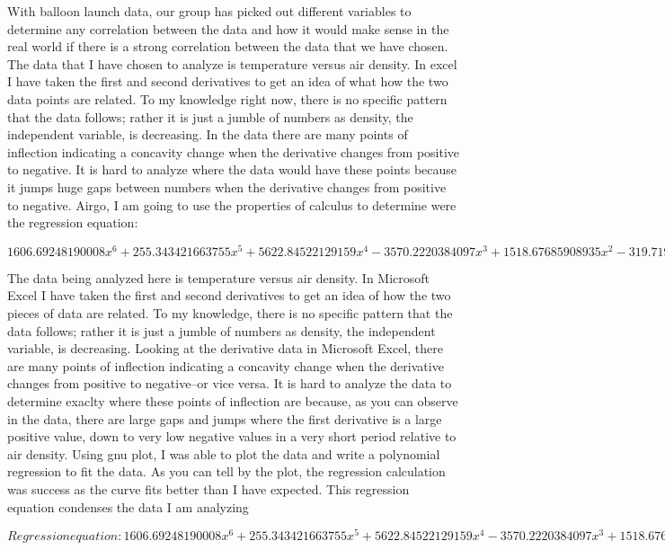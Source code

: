 \documentclass{article}
\begin{document}
With balloon launch data, our group has picked out different variables to determine any correlation between the data and how it would make sense in the real world if there is a strong correlation between the data that we have chosen.
The data that I have chosen to analyze is temperature versus air density. In excel I have taken the first and second derivatives to get an idea of what how the two data points are related. To my knowledge right now, there is no specific pattern that the data follows; rather it is just a jumble of numbers as density, the independent variable, is decreasing.
In the data there are many points of inflection indicating a concavity change when the derivative changes from positive to negative. It is hard to analyze where the data would have these points because it jumps huge gaps between numbers when the derivative changes from positive to negative. Airgo, I am going to use the properties of calculus to determine were the regression equation:

$$ 1606.69248190008x^6 + 255.343421663755x^5 + 5622.84522129159x^4 -3570.2220384097x^3 + 1518.67685908935x^2 -319.719301948874x +235.092280725325 $$

The data being analyzed here is temperature versus air density. In Microsoft Excel I have taken the first and second derivatives to get an idea of how the two pieces of data are related. To my knowledge, there is no specific pattern that the data follows; rather it is just a jumble of numbers as density, the independent variable, is decreasing.
Looking at the derivative data in Microsoft Excel, there are many points of inflection indicating a concavity change when the derivative changes from positive to negative--or vice versa. It is hard to analyze the data to determine exaclty where these points of inflection are because, as you can observe in the data, there are large gaps and jumps where the first derivative is a large positive value, down to very low negative values in a very short period relative to air density. Using gnu plot, I was able to plot the data and write a polynomial regression to fit the data. As you can tell by the plot, the regression calculation was success as the curve fits better than I have expected. This regression equation condenses the data I am analyzing

$$ Regression equation: 1606.69248190008x^6 + 255.343421663755x^5 + 5622.84522129159x^4 -3570.2220384097x^3 + 1518.67685908935x^2 -319.719301948874x +235.092280725325$$
\end{document}
